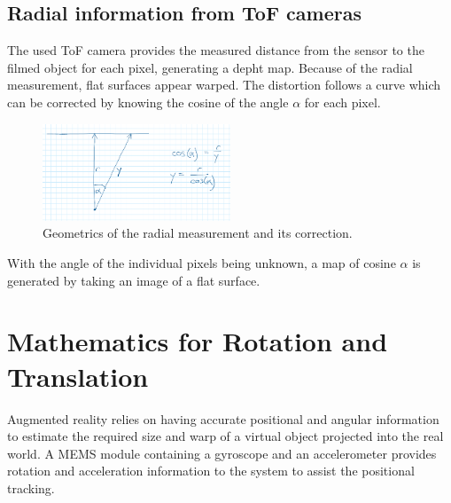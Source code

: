 \subsection{Radial information from ToF cameras}
\label{sec:RadialCorrection}
The used ToF camera provides the measured distance from the sensor to the filmed object for each pixel, generating a depht map. Because of the radial measurement, flat surfaces appear warped. The distortion follows a curve which can be corrected by knowing the cosine of the angle $\alpha$ for each pixel.
\begin{figure}[H]
    \centering
    \includegraphics[width=0.5\textwidth]{images/dummy_radial_angle.png}
    \caption{Geometrics of the radial measurement and its correction.}
    \label{im:RadialCorrection}
\end{figure}
With the angle of the individual pixels being unknown, a map of cosine $\alpha$ is generated by taking an image of a flat surface.
\section{Mathematics for Rotation and Translation}
\label{sec:LinAlgRotation}
Augmented reality relies on having accurate positional and angular information to estimate the required size and warp of a virtual object projected into the real world. A MEMS module containing a gyroscope and an accelerometer provides rotation and acceleration information to the system to assist the positional tracking.
